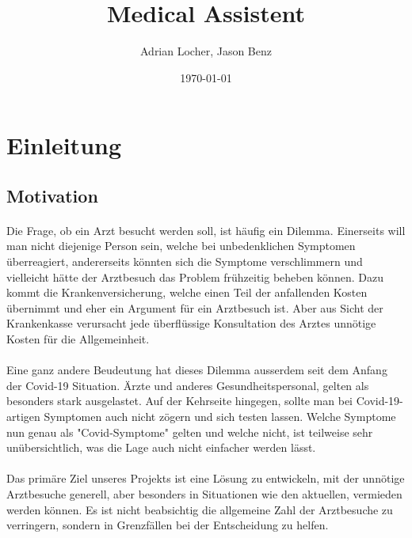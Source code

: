 \documentclass[11pt,a4paper]{article}
\title{Medical Assistent}
\author{Adrian Locher, Jason Benz}
\date{\today}
\begin{document}
\maketitle
\tableofcontents
\newpage


\section{Einleitung}
    \subsection{Motivation}
        \paragraph{}
            Die Frage, ob ein Arzt besucht werden soll, ist häufig ein Dilemma.
            Einerseits will man nicht diejenige Person sein, welche bei unbedenklichen Symptomen
            überreagiert, andererseits könnten sich die Symptome verschlimmern und vielleicht
            hätte der Arztbesuch das Problem frühzeitig beheben können. Dazu kommt die
            Krankenversicherung, welche einen Teil der anfallenden Kosten übernimmt und eher ein Argument
            für ein Arztbesuch ist. Aber aus Sicht der Krankenkasse verursacht jede überflüssige
            Konsultation des Arztes unnötige Kosten für die Allgemeinheit.
            
        \paragraph{}
            Eine ganz andere Beudeutung hat dieses Dilemma ausserdem seit dem Anfang
            der Covid-19 Situation. Ärzte und anderes Gesundheitspersonal, gelten als besonders
            stark ausgelastet. Auf der Kehrseite hingegen, sollte man bei Covid-19-artigen Symptomen
            auch nicht zögern und sich testen lassen. Welche Symptome nun genau als "Covid-Symptome"
            gelten und welche nicht, ist teilweise sehr unübersichtlich, was die Lage auch nicht
            einfacher werden lässt.

        \paragraph{}
            Das primäre Ziel unseres Projekts ist eine Lösung zu entwickeln, mit der unnötige Arztbesuche
            generell, aber besonders in Situationen wie den aktuellen, vermieden werden können.
            Es ist nicht beabsichtig die allgemeine Zahl der Arztbesuche zu verringern, sondern in
            Grenzfällen bei der Entscheidung zu helfen.
        
\end{document}
